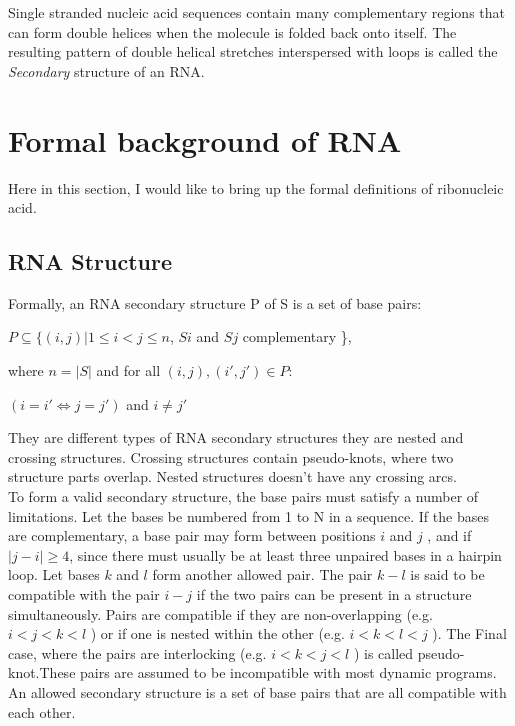 \documentclass[twoside,a4paper]{report}
\begin{document}
	Single stranded nucleic acid sequences contain many complementary regions that can form double helices when the molecule is folded back onto itself. The resulting pattern of double helical stretches interspersed with loops is called the \textit{Secondary} structure of an RNA.\\
	\section{Formal background of RNA}
	Here in this section, I would like to bring up the formal definitions of ribonucleic acid.
	\subsection{RNA Structure}
	Formally, an RNA secondary structure P of S is a set of base pairs:\\
	\begin{center}
	 $ P \subseteq \{(i, j) | 1 \leq i < j \leq n $, $ Si $ and $Sj$ complementary \},\\
	\end{center}
	where $ n = |S| $ and for all $(i, j) , ( i', j' ) \in  P:$\\
	\begin{center}
	$(i = i' \Leftrightarrow j = j')$ and $ i \neq j'$ \\
	\end{center}

	They are different types of RNA secondary structures they are nested
	and crossing structures. Crossing structures contain pseudo-knots, where two structure parts overlap. Nested structures doesn't have any crossing arcs.\\

	To form a valid secondary structure, the base pairs must satisfy a number of limitations. Let the bases be numbered from 1 to N in a sequence. If the bases are complementary, a base pair may form between positions $i$ and $j$ , and if $|j - i | \geq 4$, since there must usually be at least three unpaired bases in a hairpin loop. Let bases $k$ and $l$ form another allowed pair. The pair $k - l$ is said to be compatible with the pair $i - j$ if the two pairs can be present in a structure simultaneously. Pairs are compatible if they are non-overlapping (e.g. $i<j<k<l$ ) or if one is nested within the other (e.g. $i<k<l<j$ ). The Final case, where the pairs are interlocking (e.g. $i<k<j<l$ ) is called  pseudo-knot.These pairs are assumed to be incompatible with
	most dynamic programs. An allowed secondary structure is a set of base pairs that are all compatible with each other.\\
	
\end{document}
